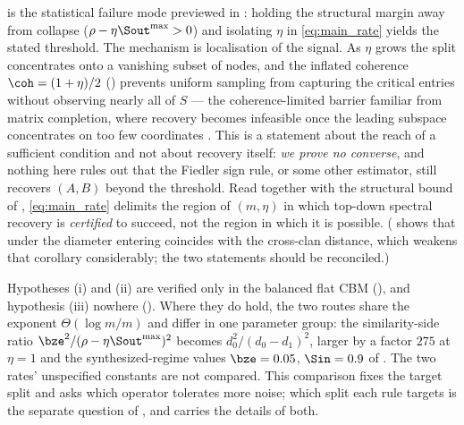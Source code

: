 \begin{remark}\label{rem:infeasible-mech}
 is the statistical failure mode previewed in
: holding the structural margin away from collapse
($\rho-\eta\Sout^{\max}>0$) and isolating $\eta$ in \eqref{eq:main_rate} yields
the stated threshold. The mechanism is localisation of the signal. As $\eta$
grows the split concentrates onto a vanishing subset of nodes, and the inflated
coherence $\coh=(1+\eta)/2$ () prevents uniform sampling
from capturing the critical entries without observing nearly all of $S$ --- the
coherence-limited barrier familiar from matrix completion, where recovery becomes
infeasible once the leading subspace concentrates on too few coordinates
\cite{candes2009power, recht2011simpler, chen2014completing}. This is a statement
about the reach of a sufficient condition and not about recovery itself: \emph{we
prove no converse}, and nothing here rules out that the Fiedler sign rule, or
some other estimator, still recovers $(A,B)$ beyond the threshold. Read together with the structural bound of ,
\eqref{eq:main_rate} delimits the region of $(m,\eta)$ in which top-down spectral
recovery is \emph{certified} to succeed, not the region in which it is possible.
( shows that under  the diameter entering
 coincides with the cross-clan distance, which weakens that
corollary considerably; the two statements should be reconciled.)
\end{remark}

\begin{remark}\label{rem:gap-scope}
Hypotheses (i) and (ii) are verified only in the balanced flat CBM
(), and hypothesis (iii) nowhere
(). Where they do hold, the two routes share the
exponent $\Theta(\log m/m)$ and differ in one parameter group: the similarity-side
ratio $\bze^{2}/(\rho-\eta\Sout^{\max})^{2}$ becomes $d_0^{2}/(d_0-d_1)^{2}$,
larger by a factor $275$ at $\eta=1$ and the synthesized-regime values
$\bze=0.05$, $\Sin=0.9$ of . The two rates' unspecified
constants are not compared. This comparison fixes the target split and asks which
operator tolerates more noise; which split each rule targets is the separate
question of , and  carries
the details of both.
\end{remark}
